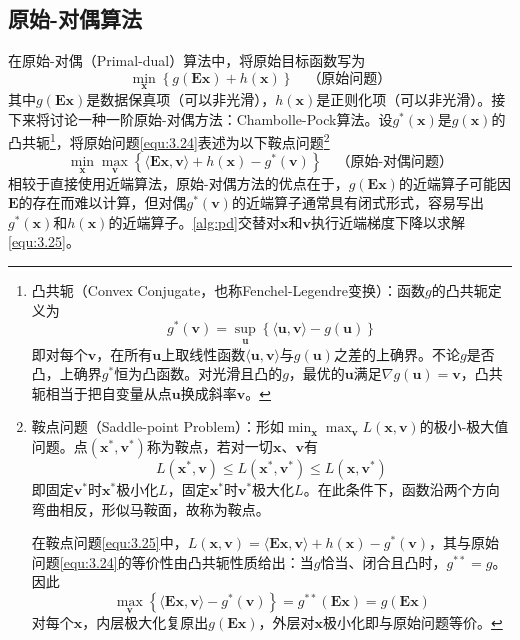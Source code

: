 \documentclass[12pt]{article}
\begin{document}
\subsection{原始-对偶算法}
在原始-对偶（Primal-dual）\label{term:PD}算法中，将原始目标函数写为
\begin{equation}
    \min_{\bm{x}}\left\{g(\mathbf{E}\bm{x})+h(\bm{x})\right\}\quad\text{（原始问题）}
    \label{equ:3.24}
\end{equation}
其中$g(\mathbf{E}\bm{x})$是数据保真项（可以非光滑），$h(\bm{x})$是正则化项（可以非光滑）。接下来将讨论一种一阶原始-对偶方法：Chambolle-Pock算法。设$g^*(\bm{x})$是$g(\bm{x})$的凸共轭\footnote{凸共轭（Convex Conjugate，也称Fenchel-Legendre变换）：函数$g$的凸共轭定义为
\begin{equation}
    g^*(\bm{v})=\sup_{\bm{u}}\left\{\langle\bm{u},\bm{v}\rangle-g(\bm{u})\right\}
\end{equation}
即对每个$\bm{v}$，在所有$\bm{u}$上取线性函数$\langle\bm{u},\bm{v}\rangle$与$g(\bm{u})$之差的上确界。不论$g$是否凸，上确界$g^*$恒为凸函数。对光滑且凸的$g$，最优的$\bm{u}$满足$\nabla g(\bm{u})=\bm{v}$，凸共轭相当于把自变量从点$\bm{u}$换成斜率$\bm{v}$。}，将原始问题\autoref{equ:3.24}表述为以下鞍点问题\footnote{鞍点问题（Saddle-point Problem）：形如$\min_{\bm{x}}\max_{\bm{v}}L(\bm{x},\bm{v})$的极小-极大值问题。点$(\bm{x}^*,\bm{v}^*)$称为鞍点，若对一切$\bm{x}$、$\bm{v}$有
\begin{equation}
    L(\bm{x}^*,\bm{v})\le L(\bm{x}^*,\bm{v}^*)\le L(\bm{x},\bm{v}^*)
\end{equation}
即固定$\bm{v}^*$时$\bm{x}^*$极小化$L$，固定$\bm{x}^*$时$\bm{v}^*$极大化$L$。在此条件下，函数沿两个方向弯曲相反，形似马鞍面，故称为鞍点。

在鞍点问题\autoref{equ:3.25}中，$L(\bm{x},\bm{v})=\langle\mathbf{E}\bm{x},\bm{v}\rangle+h(\bm{x})-g^*(\bm{v})$，其与原始问题\autoref{equ:3.24}的等价性由凸共轭性质给出：当$g$恰当、闭合且凸时，$g^{**}=g$。因此
\begin{equation}
    \max_{\bm{v}}\left\{\langle\mathbf{E}\bm{x},\bm{v}\rangle-g^*(\bm{v})\right\}=g^{**}(\mathbf{E}\bm{x})=g(\mathbf{E}\bm{x})
\end{equation}
对每个$\bm{x}$，内层极大化复原出$g(\mathbf{E}\bm{x})$，外层对$\bm{x}$极小化即与原始问题等价。}
\begin{equation}
    \min_{\bm{x}}\max_{\bm{v}} \left\{\langle\mathbf{E}\bm{x},\bm{v}\rangle+h(\bm{x})-g^*(\bm{v})\right\}\quad\text{（原始-对偶问题）}
    \label{equ:3.25}
\end{equation}
相较于直接使用近端算法，原始-对偶方法的优点在于，$g(\mathbf{E}\bm{x})$的近端算子可能因$\mathbf{E}$的存在而难以计算，但对偶$g^*(\bm{v})$的近端算子通常具有闭式形式，容易写出$g^*(\bm{x})$和$h(\bm{x})$的近端算子。\autoref{alg:pd}交替对$\bm{x}$和$\bm{v}$执行近端梯度下降以求解\autoref{equ:3.25}。
\end{document}

